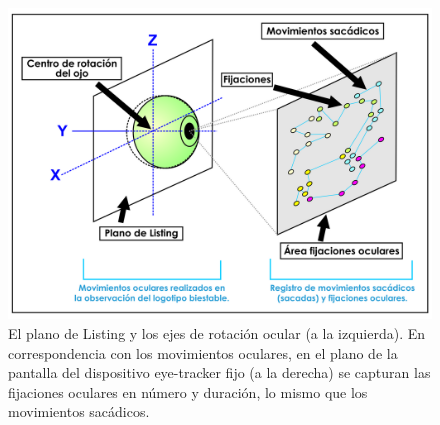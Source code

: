 \documentclass[spanish]{textolivre}
\begin{document}
\begin{figure}
\centering
\begin{minipage}{.85\textwidth}
    \centering
    \includegraphics[width=\linewidth]{Fig2.jpeg}
    \caption{El plano de Listing y los ejes de rotación ocular (a la izquierda). En correspondencia con los movimientos oculares, en el plano de la pantalla del dispositivo eye-tracker fijo (a la derecha) se capturan las fijaciones oculares en número y duración, lo mismo que los movimientos sacádicos.}
    \label{fig2}
\end{minipage}
\end{figure}
\end{document}
